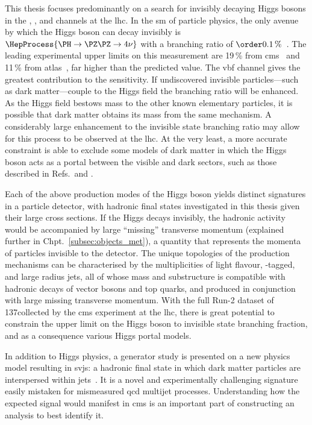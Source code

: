 This thesis focuses predominantly on a search for invisibly decaying Higgs bosons in the \ttH, \VH, and \ggH channels at the \acrshort{lhc}. In the \acrlong{sm} of particle physics, the only avenue by which the Higgs boson can decay invisibly is $\HepProcess{\PH \to \PZ\PZ \to \text{4}\nu}$ with a branching ratio of $\order{\text{0.1\,\%}}$~\cite{Heinemeyer:1559921}. The leading experimental upper limits on this measurement are 19\,\% from \acrshort{cms}~\cite{Sirunyan:2018owy} and 11\,\% from \acrshort{atlas}~\cite{ATLAS:2020kdi}, far higher than the predicted value. The \acrshort{vbf} channel gives the greatest contribution to the sensitivity. If undiscovered invisible particles---such as dark matter---couple to the Higgs field the branching ratio will be enhanced. As the Higgs field bestows mass to the other known elementary particles, it is possible that dark matter obtains its mass from the same mechanism. A considerably large enhancement to the invisible state branching ratio may allow for this process to be observed at the \acrshort{lhc}. At the very least, a more accurate constraint is able to exclude some models of dark matter in which the Higgs boson acts as a portal between the visible and dark sectors, such as those described in Refs.~and .

Each of the above production modes of the Higgs boson yields distinct signatures in a particle detector, with hadronic final states investigated in this thesis given their large cross sections. If the Higgs decays invisibly, the hadronic activity would be accompanied by large ``missing'' transverse momentum (explained further in Chpt.~\ref{subsec:objects_met}), a quantity that represents the momenta of particles invisible to the detector. The unique topologies of the production mechanisms can be characterised by the multiplicities of light flavour, \Pqb-tagged, and large radius \glspl{jet}, all of whose mass and substructure is compatible with hadronic decays of vector bosons and top quarks, and produced in conjunction with large missing transverse momentum. With the full Run-2 dataset of 137\fbinv collected by the \acrshort{cms} experiment at the \acrshort{lhc}, there is great potential to constrain the upper limit on the Higgs boson to invisible state branching fraction, and as a consequence various Higgs portal models.

In addition to Higgs physics, a generator study is presented on a new physics model resulting in \glspl{svj}: a hadronic final state in which dark matter particles are interspersed within \glspl{jet}~\cite{Cohen:2015toa,Cohen:2017pzm}. It is a novel and experimentally challenging signature easily mistaken for mismeasured \acrshort{qcd} multijet processes. Understanding how the expected signal would manifest in \acrshort{cms} is an important part of constructing an analysis to best identify it.

